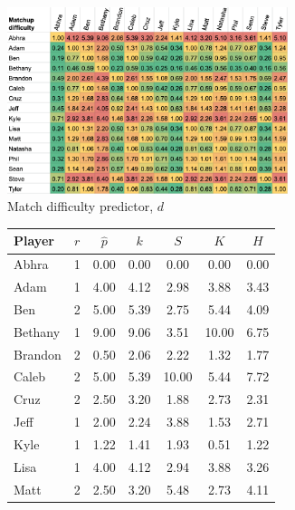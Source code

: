 \documentclass[letterpaper, 10 pt, conference]{ieeeconf}  %
\begin{document}
\begin{figure}[h!b]
        \begin{subfigure}[hb]{0.5\textwidth}
                \centering
                \includegraphics[width=0.9\textwidth]{fig/difficulty_4.png}
                \caption{Match difficulty predictor, $d$}
        \end{subfigure}
        \begin{subfigure}[hb]{0.4\textwidth}
                \footnotesize
                \centering
                \begin{tabular}{lccc|ccc}
                        \toprule
                        Player  & $r$   & $\hat{p}$ & $k$ & $S$ & $K$ & $H$ \\
                        \midrule
                        Abhra	& 1	& 0.00	& 0.00 & 0.00 & 0.00 & 0.00 \\
                        Adam	& 1	& 4.00	& 4.12 & 2.98 & 3.88 & 3.43 \\
                        Ben	& 2	& 5.00	& 5.39 & 2.75 & 5.44 & 4.09 \\
                        Bethany	& 1	& 9.00	& 9.06 & 3.51 & 10.00 & 6.75 \\
                        Brandon	& 2	& 0.50	& 2.06 & 2.22 & 1.32 & 1.77 \\
                        Caleb	& 2	& 5.00	& 5.39 & 10.00 & 5.44 & 7.72 \\
                        Cruz	& 2	& 2.50	& 3.20 & 1.88 & 2.73 & 2.31 \\
                        Jeff	& 1	& 2.00  & 2.24 & 3.88 & 1.53 & 2.71 \\
                        Kyle	& 1	& 1.22	& 1.41 & 1.93 & 0.51 & 1.22 \\
                        Lisa	& 1	& 4.00  & 4.12 & 2.94 & 3.88 & 3.26 \\
                        Matt	& 2	& 2.50  & 3.20 & 5.48 & 2.73 & 4.11 \\

\end{tabular}
\end{subfigure}
\end{figure}
\end{document}
